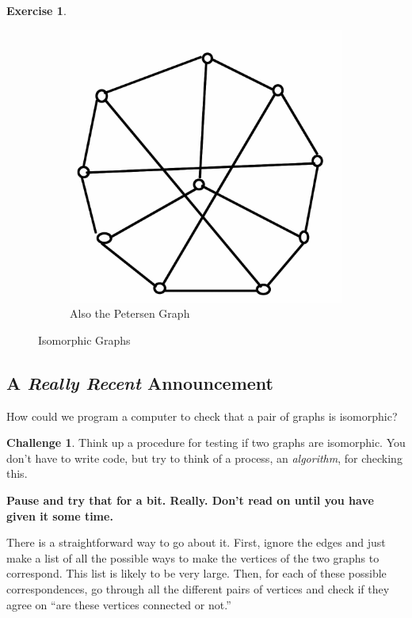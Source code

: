 \documentclass[12pt,letterpaper]{article}
\theoremstyle{definition}
\newtheorem{exercise}[question]{Exercise}
\newtheorem*{challenge}{Challenge}
\begin{document}
\begin{exercise}
\begin{figure}[h]
\begin{subfigure}[b]{0.4\textwidth}
\includegraphics[width=\textwidth]{images/petersen-alt.png}
\caption{Also the Petersen Graph}
\end{subfigure}
\caption{Isomorphic Graphs}
\label{fig:petersen}
\end{figure}
\end{exercise}

\subsection*{A \emph{Really Recent} Announcement}


How could we program a computer to check that a pair of graphs is isomorphic?

\begin{challenge}
Think up a procedure for testing if two graphs are isomorphic. You don't have to write code,
but try to think of a process, an \emph{algorithm}, for checking this.
\end{challenge}


\noindent\textbf{Pause and try that for a bit. Really. Don't read on until you have given it some time.}

There is a straightforward way to go about it. First, ignore the edges and just make a list of all the possible ways to make the vertices of the two graphs to correspond. This list is likely to be very large. Then, for each of these possible
correspondences, go through all the different pairs of vertices and check if they agree on ``are these vertices connected or not.''
\end{document}

